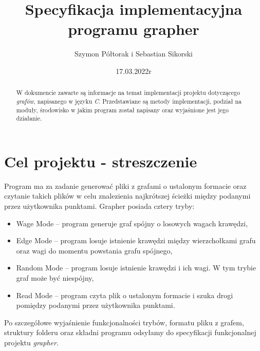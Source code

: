 \documentclass[10pt, a4paper]{report}
\title{\huge{\textbf{Specyfikacja implementacyjna} \\ programu grapher}}
\author{Szymon Półtorak i Sebastian Sikorski}
\date{17.03.2022r}
\begin{document}
    \maketitle

    \renewcommand*\thesection{\arabic{section}} 

    \begin{abstract}
        W dokumencie zawarte są informacje na temat implementacji projektu dotyczącego \textit{grafów}, napisanego w języku \textit{C}.
        Przedstawiane są metody implementacji, podział na moduły, środowisko w jakim program został napisany oraz wyjaśnione jest jego działanie.
    \end{abstract}
    
    \pagestyle{fancy}
    \fancyhf{}
    
    \tableofcontents
    \newpage

    \section{Cel projektu - streszczenie}
    Program ma za zadanie generować pliki z grafami o ustalonym formacie oraz czytanie takich plików w celu znalezienia najkrótszej ścieżki między podanymi
    przez użytkownika punktami. Grapher posiada cztery tryby:
    \begin{itemize}
        \item Wage Mode – program generuje graf spójny o losowych wagach krawędzi,
        \item Edge Mode – program losuje istnienie krawędzi między wierzchołkami grafu oraz wagi do
        momentu powstania grafu spójnego,
        \item Random Mode – program losuje istnienie krawędzi i ich wagi. W tym trybie graf może być niespójny,
        \item Read Mode – program czyta plik o ustalonym formacie i szuka drogi pomiędzy podanymi przez użytkownika punktami.        
    \end{itemize}
    Po szczegółowe wyjaśnienie funkcjonalności trybów, formatu pliku z grafem, struktury folderu oraz składni programu odsyłamy do specyfikacji funkcjonalnej projektu \textit{grapher}.
\end{document}
